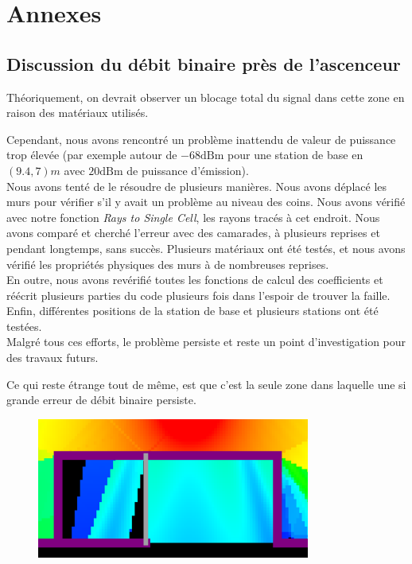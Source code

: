 \appendix
\chapter*{Annexes}
\renewcommand{\thesection}{\Alph{section}}
\section{Discussion du débit binaire près de l'ascenceur}
\label{discussion-debit-critique}
Th{\'e}oriquement, on devrait observer un blocage total du signal dans cette
zone en raison des mat{\'e}riaux utilis{\'e}s. 

Cependant, nous avons
rencontr{\'e} un probl{\`e}me inattendu de valeur de puissance trop
{\'e}lev{\'e}e (par exemple autour de $- 68 \mathrm{dBm}$ pour une station de base en $(9.4,
7) m$ avec $20 \mathrm{dBm}$ de puissance d'{\'e}mission).\\

Nous avons tent{\'e} de le
r{\'e}soudre de plusieurs mani{\`e}res. 
Nous avons d{\'e}plac{\'e} les murs
pour v{\'e}rifier s'il y avait un probl{\`e}me au niveau des coins. 
Nous avons
v{\'e}rifi{\'e} avec notre fonction \textit{Rays to Single Cell}, les rayons
trac{\'e}s {\`a} cet endroit. Nous avons compar{\'e} et cherch{\'e} l'erreur
avec des camarades, {\`a} plusieurs reprises et pendant longtemps, sans
succ{\`e}s. Plusieurs mat{\'e}riaux ont {\'e}t{\'e} test{\'e}s, et nous avons
v{\'e}rifi{\'e} les propri{\'e}t{\'e}s physiques des murs {\`a} de nombreuses
reprises. 
\\
En outre, nous avons rev{\'e}rifi{\'e} toutes les fonctions de
calcul des coefficients et r{\'e}{\'e}crit plusieurs parties du code plusieurs
fois dans l'espoir de trouver la faille. Enfin, diff{\'e}rentes positions de
la station de base et plusieurs stations ont {\'e}t{\'e} test{\'e}es.
\\ 
Malgr{\'e} tous ces efforts, le probl{\`e}me persiste et reste un point
d'investigation pour des travaux futurs. 


Ce qui reste {\'e}trange tout de même, est que
c'est la seule zone dans laquelle une si grande erreur de d{\'e}bit binaire
persiste. 

\begin{figure}[H]
    \centering
    \includegraphics[width=0.8\textwidth]{latex/images/bug-ascenseur.png}
    \label{fig:bug-ascenseur}
\end{figure}

